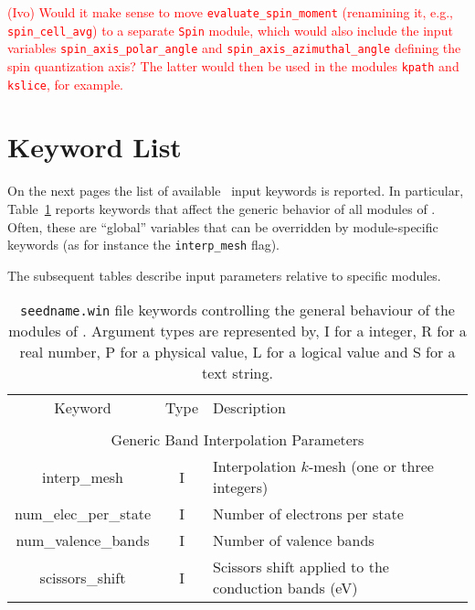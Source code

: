 \textcolor{red}{(Ivo) Would it make sense to move
  \texttt{evaluate\_spin\_moment} (renamining it, e.g.,
  \texttt{spin\_cell\_avg}) to a separate \texttt{Spin} module, which
  would also include the input variables
  \texttt{spin\_axis\_polar\_angle} and
  \texttt{spin\_axis\_azimuthal\_angle} defining the spin quantization
  axis? The latter would then be used in the modules \texttt{kpath}
  and \texttt{kslice}, for example.}

\section{Keyword List}
On the next pages the list of available
\postw\ input keywords is reported.
In particular, Table~\ref{parameter_keywords_postw90} reports keywords
that affect the generic behavior of all modules of
\postw. Often, these are ``global'' variables that can be overridden
by module-specific keywords (as for instance the {\tt interp\_mesh} flag).

The subsequent tables describe input parameters relative to specific modules.

\clearpage

\begin{table}[hH!]
\begin{center}
\begin{tabular}{|c|c|p{6cm}|}
\hline
Keyword & Type & Description \\
        &      &             \\
\hline\hline
\multicolumn{3}{|c|}{Generic Band Interpolation Parameters} \\
\hline
{\sc interp\_mesh}   & I & Interpolation $k$-mesh (one or three integers) \\
{\sc num\_elec\_per\_state}   & I & Number of electrons per state \\
{\sc num\_valence\_bands}   & I & Number of valence bands \\
{\sc scissors\_shift}   & I & Scissors shift applied to the conduction bands (eV) \\
\hline
\end{tabular}
\caption[Parameter file keywords controlling \postw.]
{{\tt seedname.win} file keywords controlling the general behaviour of
  the modules of \postw. Argument types
are represented by, I for a integer, R for a real number, P for a
physical value, L for a logical value and S for a text string.}
\label{parameter_keywords_postw90}
\end{center}
\end{table}


